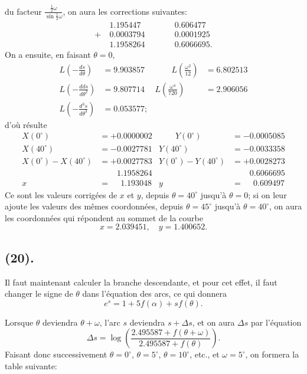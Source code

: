 \documentclass{article}
\begin{document}
du facteur $\frac{\frac{1}{2}\omega}{\sin\frac{1}{2}\omega}$, on aura les corrections suivantes:
\[ \begin{aligned} & 1.195447 &\qquad& 0.606477\\ +\ & 0.0003794 && 0.0001925\\ & 1.1958264 && 0.6066695. \end{aligned} \]
On a ensuite, en faisant $\theta=0$,
\[ \begin{aligned} L\left(-\frac{ds}{d\theta}\right)&=9.903857 &\qquad L\left(\frac{\omega^{2}}{12}\right)&=6.802513\\ L\left(-\frac{dds}{d\theta^{2}}\right)&=9.807714 & L\left(\frac{\omega^{4}}{720}\right)&=2.906056\\ L\left(-\frac{d^{3}s}{d\theta^{3}}\right)&=0.053577; \end{aligned} \]
d'où résulte
\[ \begin{aligned} X(0^{\circ})&=+0.0000002 &\qquad Y(0^{\circ})&=-0.0005085\\ X(40^{\circ})&=-0.0027781 & Y(40^{\circ})&=-0.0033358\\ X(0^{\circ})-X(40^{\circ})&=+0.0027783 & Y(0^{\circ})-Y(40^{\circ})&=+0.0028273\\ &\phantom{=+}1.1958264 & &\phantom{=+}0.6066695\\ x&=\phantom{+}1.193048 & y&=\phantom{+}0.609497 \end{aligned} \]
Ce sont les valeurs corrigées de $x$ et $y$, depuis $\theta=40^{\circ}$ jusqu'à $\theta=0$; si on leur ajoute les valeurs des mêmes coordonnées, depuis $\theta=45^{\circ}$ jusqu'à $\theta=40^{\circ}$, on aura les coordonnées qui répondent au sommet de la courbe
\[ x=2.039451,\quad y=1.400652. \]

\subsection*{(20).}

Il faut maintenant calculer la branche descendante, et pour cet effet, il faut changer le signe de $\theta$ dans l'équation des arcs, ce qui donnera
\[ e^{s}=1+5f(\alpha)+sf(\theta). \]

Lorsque $\theta$ deviendra $\theta+\omega$, l'arc $s$ deviendra $s+\Delta s$, et on aura $\Delta s$ par l'équation
\[ \Delta s=\log\left(\frac{2.495587+f(\theta+\omega)}{2.495587+f(\theta)}\right). \]
Faisant donc successivement $\theta=0^{\circ}$, $\theta=5^{\circ}$, $\theta=10^{\circ}$, etc., et $\omega=5^{\circ}$, on formera la table suivante:
\end{document}
